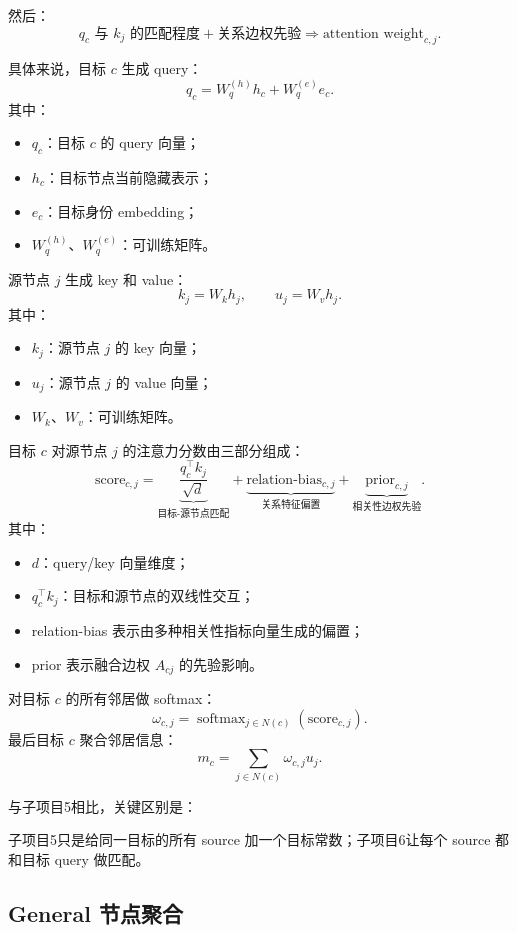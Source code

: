\documentclass[UTF8]{ctexart}
\begin{document}
然后：
\[
\boxed{q_c \text{ 与 } k_j \text{ 的匹配程度}}
+
\boxed{\text{关系边权先验}}
\Rightarrow
\boxed{\text{attention weight}_{c,j}}.
\]

具体来说，目标 \(c\) 生成 query：
\[
q_c=W_q^{(h)}h_c+W_q^{(e)}e_c.
\]
其中：
\begin{itemize}
    \item \(q_c\)：目标 \(c\) 的 query 向量；
    \item \(h_c\)：目标节点当前隐藏表示；
    \item \(e_c\)：目标身份 embedding；
    \item \(W_q^{(h)}\)、\(W_q^{(e)}\)：可训练矩阵。
\end{itemize}

源节点 \(j\) 生成 key 和 value：
\[
k_j=W_kh_j,\qquad u_j=W_vh_j.
\]
其中：
\begin{itemize}
    \item \(k_j\)：源节点 \(j\) 的 key 向量；
    \item \(u_j\)：源节点 \(j\) 的 value 向量；
    \item \(W_k\)、\(W_v\)：可训练矩阵。
\end{itemize}

目标 \(c\) 对源节点 \(j\) 的注意力分数由三部分组成：
\[
\text{score}_{c,j}
=
\underbrace{\frac{q_c^\top k_j}{\sqrt{d}}}_{\text{目标-源节点匹配}}
+
\underbrace{\text{relation-bias}_{c,j}}_{\text{关系特征偏置}}
+
\underbrace{\text{prior}_{c,j}}_{\text{相关性边权先验}}.
\]
其中：
\begin{itemize}
    \item \(d\)：query/key 向量维度；
    \item \(q_c^\top k_j\)：目标和源节点的双线性交互；
    \item relation-bias 表示由多种相关性指标向量生成的偏置；
    \item prior 表示融合边权 \(A_{cj}\) 的先验影响。
\end{itemize}

对目标 \(c\) 的所有邻居做 softmax：
\[
\omega_{c,j}
=
\operatorname{softmax}_{j\in N(c)}
(\text{score}_{c,j}).
\]
最后目标 \(c\) 聚合邻居信息：
\[
m_c
=
\sum_{j\in N(c)}
\omega_{c,j}u_j.
\]

与子项目5相比，关键区别是：
\begin{center}
子项目5只是给同一目标的所有 source 加一个目标常数；子项目6让每个 source 都和目标 query 做匹配。
\end{center}

\subsection{General 节点聚合}
\end{document}
